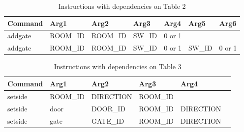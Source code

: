 \documentclass{article}
\begin{document}
\begin{table}[H]
\caption{Instructions with dependencies on Table 2}
\begin{tabular}{ | l | l | l | l | l | l | l | }
\hline
Command    & Arg1     & Arg2     & Arg3   & Arg4   & Arg5   & Arg6  \\ \hline
addgate    & ROOM\_ID & ROOM\_ID & SW\_ID & 0 or 1 &        &       \\ \hline
addgate    & ROOM\_ID & ROOM\_ID & SW\_ID & 0 or 1 & SW\_ID & 0 or 1\\ \hline
\end{tabular}
\end{table}

\begin{table}[H]
\caption{Instructions with dependencies on Table 3}
\begin{tabular}{ | l | l | l | l | l | l | }
\hline
Command    & Arg1    & Arg2      & Arg3    & Arg4      \\ \hline
setside    & ROOM\_ID & DIRECTION & ROOM\_ID &           \\ \hline
setside    & door    & DOOR\_ID   & ROOM\_ID & DIRECTION \\ \hline
setside    & gate    & GATE\_ID   & ROOM\_ID & DIRECTION \\ \hline
\end{tabular}
\end{table}
\end{document}
